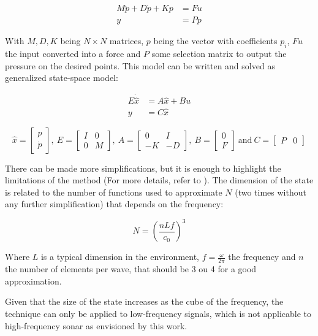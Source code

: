 \begin{align*}
M\ddot{p} + D\dot{p} + Kp &= Fu \\
y &= Pp
\end{align*}

With \(M,D,K\) being \(N \times N \) matrices, $p$ being the vector with
coefficients $p_i$, $Fu$ the input converted into a force and $P$ some selection
matrix to output the pressure on the desired points. This model can be written
and solved as generalized state-space model:

\begin{align*}
E\dot{\hat{x}} &= A\hat{x} + Bu \\
y &= C\hat{x}
\end{align*}

\[
\hat{x} =
  \begin{bmatrix}
    p \\
    \dot{p}
  \end{bmatrix},~
E =
  \begin{bmatrix}
    I & 0 \\
    0 & M
  \end{bmatrix},~
A =
  \begin{bmatrix}
    0 & I \\
    -K & -D
  \end{bmatrix},~
B =
  \begin{bmatrix}
    0 \\
    F
  \end{bmatrix}
  ~
  \text{and}
  ~
C =
  \begin{bmatrix}
    P & 0 
  \end{bmatrix}
\]
 
 There can be made more simplifications, but it is enough to highlight the
 limitations of the method (For more details, refer to
 \citet{deines2006comparative}). The dimension of the state is related to
 the number of functions used to approximate $N$ (two times without any further
 simplification) that depends on the frequency:
 
 \[N = \left(\frac{nLf}{c_0}\right)^3 \]
 
 Where $L$ is a typical dimension in the environment, $f = \frac{\omega}{2\pi}$
 the frequency and $n$ the number of elements per wave, that should be 3 ou 4
 for a good approximation\cite{deines2006comparative}.
 
 Given that the size of the state increases as the cube of the frequency, the
 technique can only be applied to low-frequency signals, which is not applicable
 to high-frequency sonar as envisioned by this work. 

